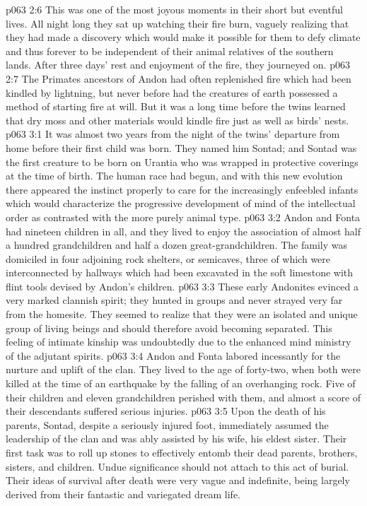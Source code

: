 \vs p063 2:6 This was one of the most joyous moments in their short but eventful lives. All night long they sat up watching their fire burn, vaguely realizing that they had made a discovery which would make it possible for them to defy climate and thus forever to be independent of their animal relatives of the southern lands. After three days’ rest and enjoyment of the fire, they journeyed on.
\vs p063 2:7 The Primates ancestors of Andon had often replenished fire which had been kindled by lightning, but never before had the creatures of earth possessed a method of starting fire at will. But it was a long time before the twins learned that dry moss and other materials would kindle fire just as well as birds’ nests.\plusone
{}
\vs p063 3:1 It was almost two years from the night of the twins’ departure from home before their first child was born. They named him Sontad; and Sontad was the first creature to be born on Urantia who was wrapped in protective coverings at the time of birth. The human race had begun, and with this new evolution there appeared the instinct properly to care for the increasingly enfeebled infants which would characterize the progressive development of mind of the intellectual order as contrasted with the more purely animal type.
\vs p063 3:2 Andon and Fonta had nineteen children in all, and they lived to enjoy the association of almost half a hundred grandchildren and half a dozen great\hyp{}grandchildren. The family was domiciled in four adjoining rock shelters, or semicaves, three of which were interconnected by hallways which had been excavated in the soft limestone with flint tools devised by Andon’s children.
\vs p063 3:3 These early Andonites evinced a very marked clannish spirit; they hunted in groups and never strayed very far from the homesite. They seemed to realize that they were an isolated and unique group of living beings and should therefore avoid becoming separated. This feeling of intimate kinship was undoubtedly due to the enhanced mind ministry of the adjutant spirits.
\pc \vs p063 3:4 Andon and Fonta labored incessantly for the nurture and uplift of the clan. They lived to the age of forty\hyp{}two, when both were killed at the time of an earthquake by the falling of an overhanging rock. Five of their children and eleven grandchildren perished with them, and almost a score of their descendants suffered serious injuries.
\vs p063 3:5 Upon the death of his parents, Sontad, despite a seriously injured foot, immediately assumed the leadership of the clan and was ably assisted by his wife, his eldest sister. Their first task was to roll up stones to effectively entomb their dead parents, brothers, sisters, and children. Undue significance should not attach to this act of burial. Their ideas of survival after death were very vague and indefinite, being largely derived from their fantastic and variegated dream life.
